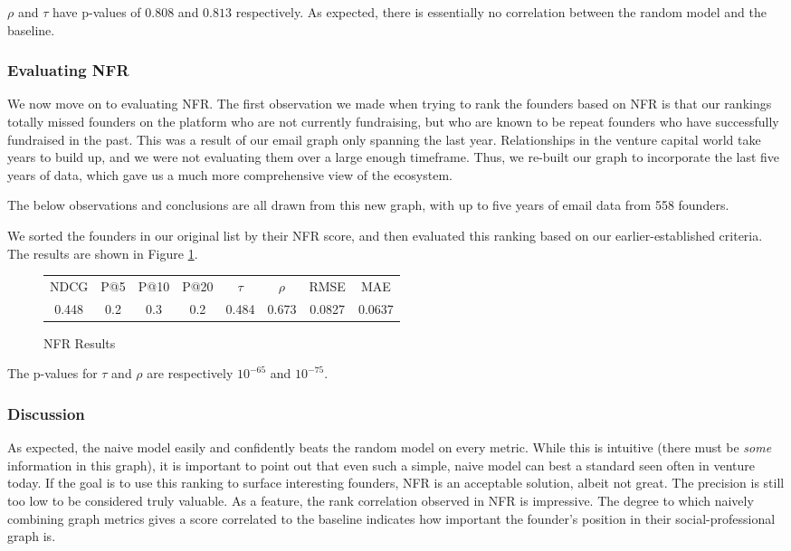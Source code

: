 $\rho$ and $\tau$ have p-values of $0.808$ and $0.813$ respectively. As expected, there is essentially no correlation between the random model and the baseline.

\subsubsection{Evaluating NFR}
\label{ch5:nfr:eval}

We now move on to evaluating NFR. The first observation we made when trying to rank the founders based on NFR is that our rankings totally missed founders on the platform who are not currently fundraising, but who are known to be repeat founders who have successfully fundraised in the past. This was a result of our email graph only spanning the last year. Relationships in the venture capital world take years to build up, and we were not evaluating them over a large enough timeframe. Thus, we re-built our graph to incorporate the last five years of data, which gave us a much more comprehensive view of the ecosystem.

The below observations and conclusions are all drawn from this new graph, with up to five years of email data from 558 founders.

We sorted the founders in our original list by their NFR score, and then evaluated this ranking based on our earlier-established criteria. The results are shown in Figure \ref{fig:nfr:results}.

\begin{figure}[ht]
\begin{tabular}{c | c | c | c | c | c | c | c}
NDCG & P@5 & P@10 & P@20 & $\tau$ & $\rho$ & RMSE & MAE  \\
0.448 & 0.2 & 0.3 & 0.2 & 0.484 & 0.673 & 0.0827 & 0.0637 \\
\end{tabular}
\centering
\caption{NFR Results}
\label{fig:nfr:results}
\end{figure}

The p-values for $\tau$ and $\rho$ are respectively $10^{-65}$ and $10^{-75}$.

\subsubsection{Discussion}

As expected, the naive model easily and confidently beats the random model on every metric. While this is intuitive (there must be \textit{some} information in this graph), it is important to point out that even such a simple, naive model can best a standard seen often in venture today. If the goal is to use this ranking to surface interesting founders, NFR is an acceptable solution, albeit not great. The precision is still too low to be considered truly valuable. As a feature, the rank correlation observed in NFR is impressive. The degree to which naively combining graph metrics gives a score correlated to the baseline indicates how important the founder's position in their social-professional graph is.

